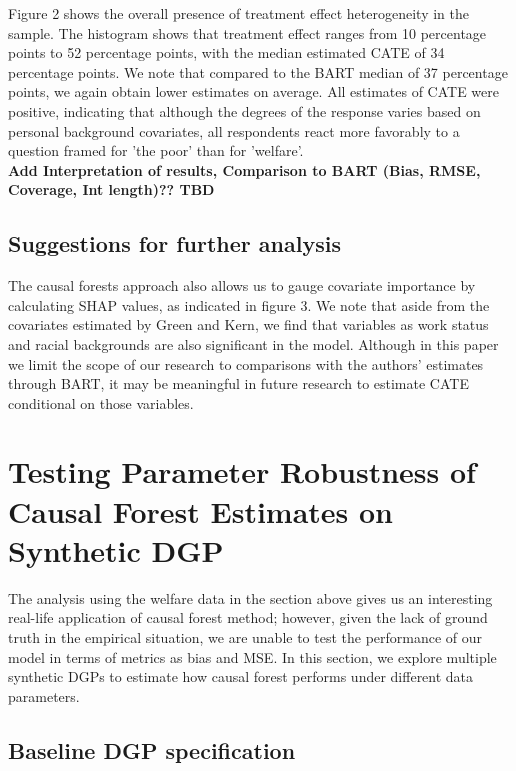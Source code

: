 \documentclass[12pt]{article}
\begin{document}
Figure 2 shows the overall presence of treatment effect heterogeneity in the sample. The histogram shows that treatment effect ranges from 10 percentage points to 52 percentage points, with the median estimated CATE of 34 percentage points. We note that compared to the BART median of 37 percentage points, we again obtain lower estimates on average. All estimates of CATE were positive, indicating that although the degrees of the response varies based on personal background covariates, all respondents react more favorably to a question framed for 'the poor' than for 'welfare'. \\

\textbf{Add Interpretation of results, Comparison to BART (Bias, RMSE, Coverage, Int length)?? TBD} 


\subsection{Suggestions for further analysis}
The causal forests approach also allows us to gauge covariate importance by calculating SHAP values, as indicated in figure 3.  We note that aside from the covariates estimated by Green and Kern, we find that variables as work status and racial backgrounds are also significant in the model. Although in this paper we limit the scope of our research to comparisons with the authors' estimates through BART, it may be meaningful in future research to estimate CATE conditional on those variables. \\





\section{Testing Parameter Robustness of Causal Forest Estimates on Synthetic DGP} 

The analysis using the welfare data in the section above gives us an interesting real-life application of causal forest method; however, given the lack of ground truth in the empirical situation, we are unable to test the performance of our model in terms of metrics as bias and MSE. In this section, we explore multiple synthetic DGPs to estimate how causal forest performs under different data parameters. 

\subsection{Baseline DGP specification} 
\end{document}
